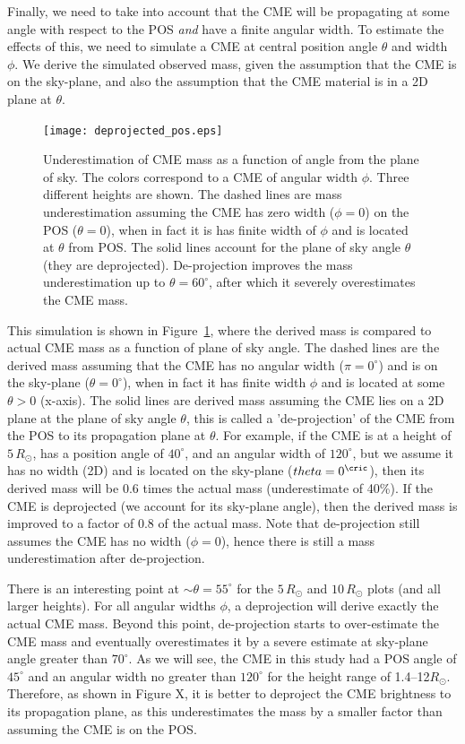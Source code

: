 Finally, we need to take into account that the CME will be propagating at some angle with respect to the POS \emph{and} have a finite angular width. To estimate the effects of this, we need to simulate a CME at central position angle $\theta$ and width $\phi$. We derive the simulated observed mass, given the assumption that the CME is on the sky-plane, and also the assumption that the CME material is in a 2D plane at $\theta$. 
\begin{figure}[!ht]
\begin{center}
\texttt{[image: deprojected\_pos.eps]}
\caption{Underestimation of CME mass as a function of angle from the plane of sky. The colors correspond to a CME of angular width $\phi$. Three different heights are shown. The dashed lines are mass underestimation assuming the CME has zero width ($\phi=0$) on the POS ($\theta=0$), when in fact it is has finite width of $\phi$ and is located at $\theta$ from POS. The solid lines account for the plane of sky angle $\theta$ (they are deprojected). De-projection improves the mass underestimation up to $\theta=60^{\circ}$, after which it severely overestimates the CME mass.}
\label{fig:deprojection}
\end{center}
\end{figure}
\clearpage

This simulation is shown in Figure~\ref{fig:deprojection}, where the derived mass is compared to actual CME mass as a function of plane of sky angle. The dashed lines are the derived mass assuming that the CME has no angular width ($\pi=0^{\circ}$) and is on the sky-plane ($\theta=0^{\circ}$), when in fact it has finite width $\phi$ and is located at some $\theta >0$ (x-axis). The solid lines are derived mass assuming the CME lies on a 2D plane at the plane of sky angle $\theta$, this is called a 'de-projection' of the CME from the POS to its propagation plane at $\theta$. For example, if the CME is at a height of $5\,R_{\odot}$, has a position angle of $40^{\circ}$, and an angular width of $120^{\circ}$, but we assume it has no width (2D) and is located on the sky-plane ($theta=0^{\cric}$), then its derived mass will be 0.6 times the actual mass (underestimate of 40\%). If the CME is deprojected (we account for its sky-plane angle), then the derived mass is improved to a factor of 0.8 of the actual mass. Note that de-projection still assumes the CME has no width ($\phi=0$), hence there is still a mass underestimation after de-projection.

There is an interesting point at $\sim$$\theta=55^{\circ}$ for the $5\,R_{\odot}$ and $10\,R_{\odot}$ plots (and all larger heights). For all angular widths $\phi$, a deprojection will derive exactly the actual CME mass. Beyond this point, de-projection starts to over-estimate the CME mass and eventually overestimates it by a severe estimate at sky-plane angle greater than $70^{\circ}$. As we will see, the CME in this study had a POS angle of $45^{\circ}$ and an angular width no greater than $120^{\circ}$ for the height range of 1.4--12$R_{\odot}$. Therefore, as shown in Figure X, it is better to deproject the CME brightness to its propagation plane, as this underestimates the mass by a smaller factor than assuming the CME is on the POS.



